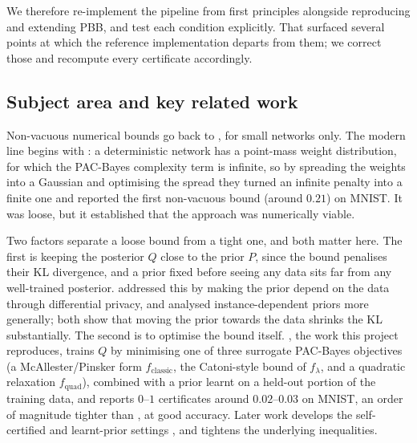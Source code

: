 We therefore re-implement the pipeline from first principles alongside
reproducing and extending PBB, and test each condition explicitly. That surfaced
several points at which the reference implementation departs from them; we
correct those and recompute every certificate accordingly.

\subsection{Subject area and key related work}\label{sec:related}

Non-vacuous numerical bounds go back to \textcite{langford2001}, for small
networks only. The modern line begins with \textcite{dziugaite2017}: a
deterministic network has a point-mass weight distribution, for which the
PAC-Bayes complexity term is infinite, so by spreading the weights into a Gaussian
and optimising the spread they turned an infinite penalty into a finite one and
reported the first non-vacuous bound (around $0.21$) on MNIST. It was loose, but
it established that the approach was numerically viable.

Two factors separate a loose bound from a tight one, and both matter here. The
first is keeping the posterior $Q$ close to the prior $P$, since the bound
penalises their KL divergence, and a prior fixed before seeing any data sits far
from any well-trained posterior. \textcite{dziugaite2018} addressed this by making
the prior depend on the data through differential privacy, and
\textcite{rivasplata2018} analysed instance-dependent priors more generally; both
show that moving the prior towards the data shrinks the KL substantially. The
second is to optimise the bound itself. \textcite{perezortiz2021}, the work this
project reproduces, trains $Q$ by minimising one of three surrogate PAC-Bayes
objectives (a McAllester/Pinsker form $f_{\text{classic}}$, the Catoni-style bound
of \textcite{thiemann2017} $f_{\lambda}$, and a quadratic relaxation
$f_{\text{quad}}$), combined with a prior learnt on a held-out portion of the
training data, and reports $0$--$1$ certificates around $0.02$--$0.03$ on MNIST,
an order of magnitude tighter than \textcite{dziugaite2017}, at good accuracy.
Later work develops the self-certified and learnt-prior settings
\parencite{perezortiz2021b,perezortiz2021c}, and \textcite{garciaperez2025}
tightens the underlying inequalities.

